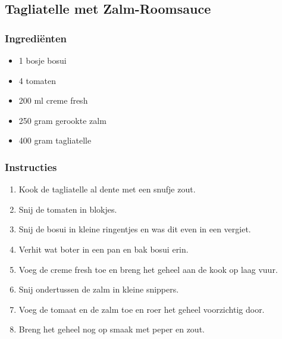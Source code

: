 \subsection{Tagliatelle met Zalm-Roomsauce}
\subsubsection*{Ingrediënten}
\begin{multicols}{2}
    \begin{itemize}
        \item 1 bosje bosui
        \item 4 tomaten
        \item 200 ml creme fresh
        \item 250 gram gerookte zalm
        \item 400 gram tagliatelle
    \end{itemize}
\end{multicols}

\subsubsection*{Instructies}
\begin{multicols}{2}
    \begin{enumerate}
        \item Kook de tagliatelle al dente met een snufje zout. 
        \item Snij de tomaten in blokjes.
        \item Snij de bosui in kleine ringentjes en was dit even in een vergiet.
        \item Verhit wat boter in een pan en bak bosui erin.
        \item Voeg de creme fresh toe en breng het geheel aan de kook op laag vuur.
        \item Snij ondertussen de zalm in kleine snippers.
        \item Voeg de tomaat en de zalm toe en roer het geheel voorzichtig door.
        \item Breng het geheel nog op smaak met peper en zout.
    \end{enumerate}
\end{multicols}